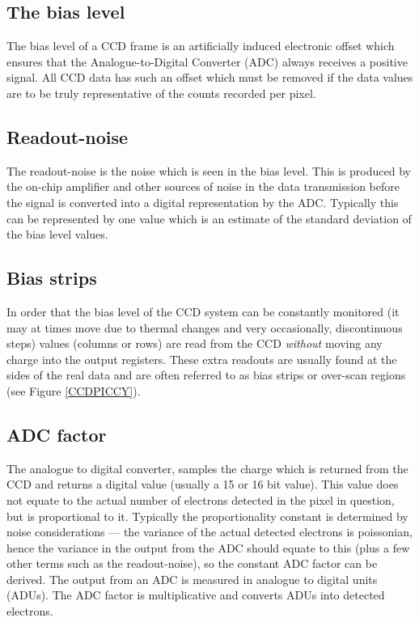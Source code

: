 \documentclass[twoside,11pt]{article}
\newcommand{\xlabel}[1]{}
\renewcommand{\_}{\texttt{\symbol{95}}}
\begin{document}
\subsection{The bias level\xlabel{CCDglosbias}}
The bias level of a CCD frame is an artificially induced electronic offset
which ensures that the Analogue-to-Digital Converter (ADC) always receives a
positive signal. All CCD data has such an offset which must be removed if the
data values are to be truly representative of the counts recorded per pixel.

\subsection{Readout-noise\xlabel{CCDglosreadnoise}}
The readout-noise is the noise which is seen in the bias level. This is produced
by the on-chip amplifier and other sources of noise in the data transmission
before the signal is converted into a digital representation by the ADC.
Typically this can be represented by one value which is an estimate of the
standard deviation of the bias level values.

\subsection{Bias strips\xlabel{CCDglosbiasstrips}}
In order that the bias level of the CCD system can be constantly monitored (it
may at times move due to thermal changes and very occasionally, discontinuous
steps) values (columns or rows) are read from the CCD {\em without} moving any
charge into the output registers. These extra readouts are usually found at the
sides of the real data and are often referred to as bias strips or over-scan
regions (see Figure \ref{CCDPICCY}).

\subsection{ADC factor\xlabel{CCDglosADCfactor}}
The analogue to digital converter, samples the charge which is returned from
the CCD and returns a digital value (usually a 15 or 16 bit value). This value
does not equate to the actual number of electrons detected in the pixel in
question, but is proportional to it. Typically the proportionality constant is
determined by noise considerations --- the variance of the actual detected
electrons is poissonian, hence the variance in the output from the ADC should
equate to this (plus a few other terms such as the readout-noise), so the
constant ADC factor can be derived. The output from an ADC is measured in
analogue to digital units (ADUs). The ADC factor is multiplicative and converts
ADUs into detected electrons.
\end{document}
